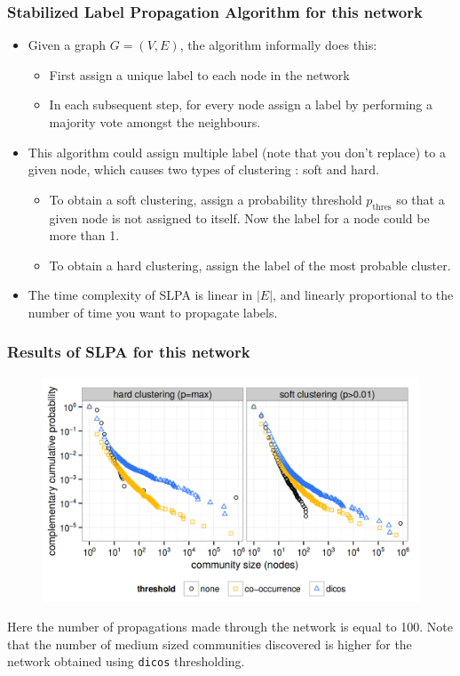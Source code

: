 \documentclass[10pt, compress]{beamer}
\begin{document}
\begin{frame}[fragile]
	\frametitle{\normalsize Stabilized Label Propagation Algorithm for this network}
\vspace{-7mm}
\begin{itemize}
\item Given a graph \(G = (V, E)\), the algorithm informally does this:
\begin{itemize}
	\item First assign a unique label to each node in the network
	\item In each subsequent step, for every node assign a label by performing a majority vote amongst the neighbours.
\end{itemize}
\item This algorithm could assign multiple label (note that you don't replace) to a given node, which causes two types of clustering : soft and hard.
\begin{itemize}
\item To obtain a soft clustering, assign a probability threshold \(p_{\text{thres}}\) so that a given node is not assigned to itself. Now the label for a node could be more than 1.
\item To obtain a hard clustering, assign the label of the most probable cluster.
\end{itemize}
\item The time complexity of SLPA is linear in \(|E|\), and linearly proportional to the number of time you want to propagate labels.
\end{itemize}
\end{frame}

\begin{frame}[fragile]
	\frametitle{Results of SLPA for this network}
\vspace{-10mm}
\begin{figure}
	\centering
    \includegraphics[width=0.8\linewidth]{comm-pdf.png}
\end{figure}
\begin{center}
Here the number of propagations made through the network is equal to 100. Note that the number of medium sized communities discovered is higher for the network obtained using \texttt{dicos} thresholding.
\end{center}
\end{frame}
\end{document}
